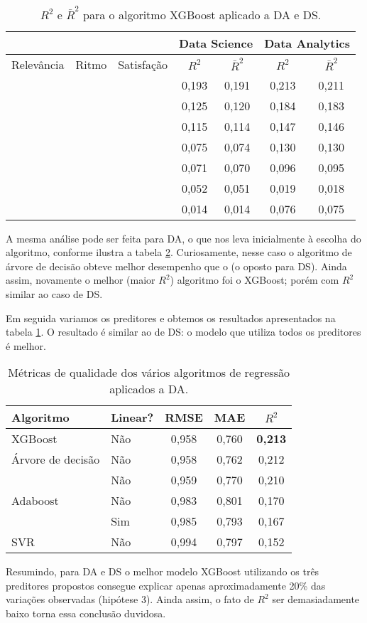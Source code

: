 \begin{table}
	\centering
	\caption{$R^2$ e $\bar R^2$ para o algoritmo XGBoost aplicado a DA e DS.}
	\label{tab:r2-adjusted}
	\begin{tabular}{ccccccc}
		\toprule
		           &            &            & \multicolumn{2}{c}{ Data Science  } & \multicolumn{2}{c}{ Data Analytics }\\
		\midrule
		Relevância & Ritmo      & Satisfação & $R^2$     & $\bar R^2$ & $R^2$     & $\bar R^2$\\
		\midrule
		\checkmark & \checkmark & \checkmark & 0,193 & 0,191 & 0,213 & 0,211 \\
		           & \checkmark & \checkmark & 0,125 & 0,120 & 0,184 & 0,183 \\
		\checkmark &            & \checkmark & 0,115 & 0,114 & 0,147 & 0,146 \\
		           &            & \checkmark & 0,075 & 0,074 & 0,130 & 0,130 \\
		\checkmark & \checkmark &            & 0,071 & 0,070 & 0,096 & 0,095 \\
		\checkmark &            &            & 0,052 & 0,051 & 0,019 & 0,018 \\
		           & \checkmark &            & 0,014 & 0,014 & 0,076 & 0,075 \\
		\bottomrule
	\end{tabular}
\end{table}

A mesma análise pode ser feita para DA, o que nos leva inicialmente à escolha do algoritmo, conforme ilustra a tabela \ref{tab:reg-da-1}.
Curiosamente, nesse caso o algoritmo de árvore de decisão obteve melhor desempenho que o  (o oposto para DS).
Ainda assim, novamente o melhor (maior $R^2$) algoritmo foi o XGBoost; porém com $R^2$ similar ao caso de DS.

Em seguida variamos os preditores e obtemos os resultados apresentados na tabela \ref{tab:r2-adjusted}.
O resultado é similar ao de DS: o modelo que utiliza todos os preditores é melhor.

\begin{table}
	\centering
	\caption{Métricas de qualidade dos vários algoritmos de regressão aplicados a DA.}
	\label{tab:reg-da-1}
	\begin{tabular}{llccc}
		\toprule
		Algoritmo               & Linear? & RMSE  &   MAE & $R^2$\\
		\midrule
		XGBoost                 & Não     & 0,958 & 0,760 & \textbf{0,213}\\
		Árvore de decisão       & Não     & 0,958 & 0,762 & 0,212\\
		\foreign{Random Forest} & Não     & 0,959 & 0,770 & 0,210\\
		Adaboost                & Não     & 0,983 & 0,801 & 0,170\\
		\foreign{ElasticNet}    & Sim     & 0,985 & 0,793 & 0,167\\
		SVR                     & Não     & 0,994 & 0,797 & 0,152\\
		\bottomrule
	\end{tabular}
\end{table}

Resumindo, para DA e DS o melhor modelo XGBoost utilizando os três preditores propostos consegue explicar apenas aproximadamente 20\% das variações observadas (hipótese 3).
Ainda assim, o fato de $R^2$ ser demasiadamente baixo torna essa conclusão duvidosa.
